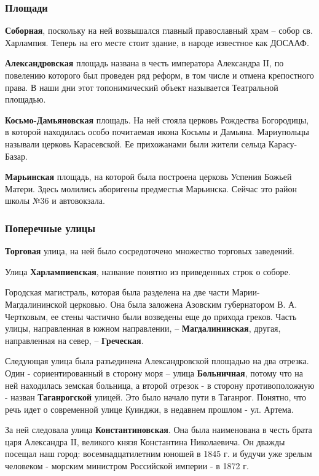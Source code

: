 \subsubsection{Площади}

\textbf{Соборная}, поскольку  на ней возвышался главный православный  храм – собор св.
Харлампия. Теперь на его месте стоит здание, в народе известное как ДОСААФ.

\textbf{Александровская} площадь названа в честь императора Александра II, по повелению
которого был проведен ряд реформ, в том числе и отмена  крепостного права.  В
наши  дни  этот топонимический объект называется Театральной площадью.

\textbf{Косьмо-Дамьяновская} площадь. На ней стояла церковь Рождества Богородицы, в
которой находилась  особо почитаемая икона Косьмы и Дамьяна. Мариупольцы
называли церковь Карасевской. Ее прихожанами были жители сельца Карасу-Базар.

\textbf{Марьинская} площадь, на которой была построена церковь Успения Божьей Матери.
Здесь молились аборигены предместья Марьинска. Сейчас это район школы №36 и
автовокзала.

\subsubsection{Поперечные улицы}

\textbf{Торговая} улица, на ней было сосредоточено множество торговых заведений.

Улица \textbf{Харлампиевская}, название понятно из приведенных строк о соборе. 

Городская магистраль, которая была разделена на две части Марии-Магдалининской
церковью. Она была заложена Азовским губернатором В. А. Чертковым, ее стены
частично были возведены еще до прихода греков. Часть улицы, направленная в
южном направлении, – \textbf{Магдалининская}, другая, направленная  на север, –
\textbf{Греческая}.

Следующая улица была  разъединена Александровской площадью на два отрезка. Один
- сориентированный в сторону моря – улица \textbf{Больничная}, потому что на ней
находилась земская больница, а второй отрезок - в сторону противоположную -
назван  \textbf{Таганрогской} улицей. Это было начало пути в Таганрог. Понятно, что речь
идет о современной улице Куинджи, в недавнем прошлом - ул. Артема.

За ней следовала улица \textbf{Константиновская}. Она была наименована в честь брата
царя Александра ΙΙ,  великого князя Константина Николаевича. Он дважды посещал
наш город: восемнадцатилетним юношей в 1845 г.  и будучи уже  зрелым человеком
- морским министром Российской империи - в 1872 г. 

